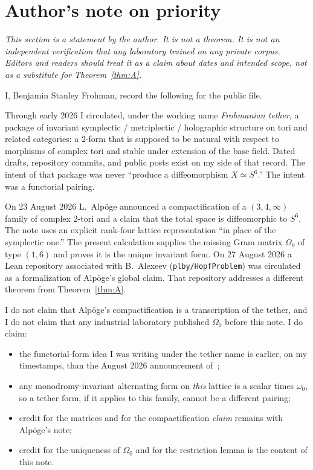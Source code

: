 \documentclass[11pt,a4paper]{article}
\theoremstyle{definition}
\theoremstyle{remark}
\begin{document}
\section*{Author's note on priority}

\textit{This section is a statement by the author. It is not a theorem. It is not an independent verification that any laboratory trained on any private corpus. Editors and readers should treat it as a claim about dates and intended scope, not as a substitute for Theorem~\ref{thm:A}.}

I, Benjamin Stanley Frohman, record the following for the public file.

Through early 2026 I circulated, under the working name \emph{Frohmanian tether}, a package of invariant symplectic / metriplectic / holographic structure on tori and related categories: a $2$-form that is supposed to be natural with respect to morphisms of complex tori and stable under extension of the base field. Dated drafts, repository commits, and public posts exist on my side of that record. The intent of that package was never ``produce a diffeomorphism $X\simeq S^6$.'' The intent was a functorial pairing.

On 23 August 2026 L.\ Alp\"oge announced a compactification of a $(3,4,\infty)$ family of complex $2$-tori and a claim that the total space is diffeomorphic to $S^6$. The note uses an explicit rank-four lattice representation ``in place of the symplectic one.'' The present calculation supplies the missing Gram matrix $\Omega_0$ of type $(1,6)$ and proves it is the unique invariant form. On 27 August 2026 a Lean repository associated with B.\ Alexeev (\texttt{plby/HopfProblem}) was circulated as a formalization of Alp\"oge's global claim. That repository addresses a different theorem from Theorem~\ref{thm:A}.

I do not claim that Alp\"oge's compactification is a transcription of the tether, and I do not claim that any industrial laboratory published $\Omega_0$ before this note. I do claim:

\begin{itemize}
\item the functorial-form idea I was writing under the tether name is earlier, on my timestamps, than the August 2026 announcement of~\cite{AlpogeS6};
\item any monodromy-invariant alternating form on \emph{this} lattice is a scalar times $\omega_0$, so a tether form, if it applies to this family, cannot be a different pairing;
\item credit for the matrices and for the compactification \emph{claim} remains with Alp\"oge's note;
\item credit for the uniqueness of $\Omega_0$ and for the restriction lemma is the content of this note.
\end{itemize}
\end{document}

